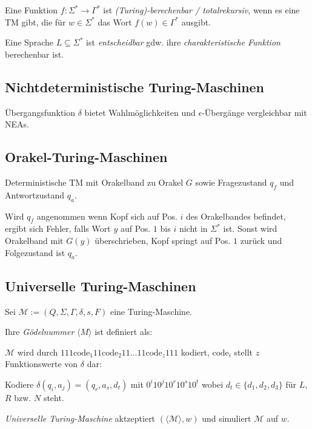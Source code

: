 \spacing

Eine Funktion $f : \Sigma^* \to \Gamma^*$ ist \emph{(Turing)-berechenbar / totalrekursiv}, wenn es eine TM gibt, die für $w \in \Sigma^*$ das Wort $f(w) \in \Gamma^*$ ausgibt.

\spacing

Eine Sprache $L \subseteq \Sigma^*$ ist \emph{entscheidbar} gdw. ihre \emph{charakteristische Funktion} berechenbar ist.

\subsection*{Nichtdeterministische Turing-Maschinen}

Übergangsfunktion $\delta$ bietet Wahlmöglichkeiten und $\epsilon$-Übergänge vergleichbar mit NEAs.

\subsection*{Orakel-Turing-Maschinen}

Deterministische TM mit Orakelband zu Orakel $G$ sowie Fragezustand $q_f$ und Antwortzustand $q_a$.

\spacing

Wird $q_f$ angenommen wenn Kopf sich auf Pos. $i$ des Orakelbandes befindet, ergibt sich Fehler, falls Wort $y$ auf Pos. $1$ bis $i$ nicht in $\Sigma^*$ ist. Sonst wird Orakelband mit $G(y)$ überschrieben, Kopf springt auf Pos. $1$ zurück und Folgezustand ist $q_a$.

\subsection*{Universelle Turing-Maschinen}

Sei $\mathcal{M} := (Q,\Sigma,\Gamma,\delta,s,F)$ eine Turing-Maschine.

Ihre \emph{Gödelnummer} $\langle M \rangle$ ist definiert als:

\spacing

$\mathcal{M}$ wird durch $111\text{code}_1 11\text{code}_2 11 \dots 11\text{code}_z 111$ kodiert, $\text{code}_i$ stellt $z$ Funktionswerte von $\delta$ dar:

\spacing

Kodiere $\delta(q_i,a_j) = (q_r,a_s,d_t)$ mit $0^i10^j10^r10^s10^t$ wobei $d_t \in \{d_1,d_2,d_3\}$ für $L$, $R$ bzw. $N$ steht.

\spacing

\emph{Universelle Turing-Maschine} aktzeptiert $(\langle \mathcal{M} \rangle, w)$ und simuliert $\mathcal{M}$ auf $w$.

